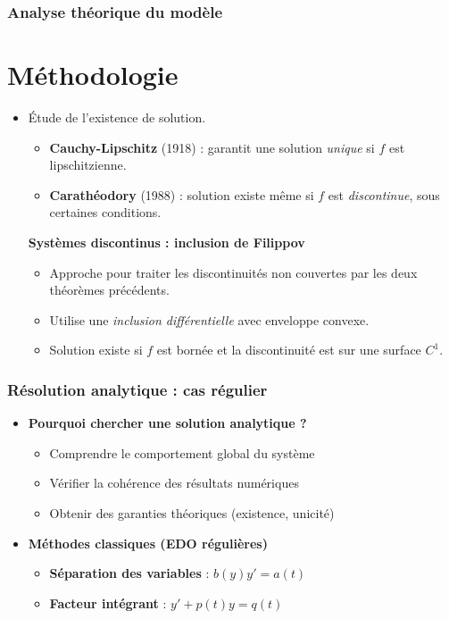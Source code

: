 \documentclass[handout]{beamer}
\newtheorem{pbm et hypo}[thm]{Problématique et hypothèses}
\begin{document}
	\begin{frame}
		\frametitle{Analyse théorique du modèle}
		\section{Méthodologie}
		\begin{itemize}
			\item[\maltese] Étude de l'existence de solution.
			\begin{itemize}
				\item \textbf{Cauchy-Lipschitz} (1918) : garantit une solution \textit{unique} si $f$ est lipschitzienne.
				\item \textbf{Carathéodory} (1988) : solution existe même si $f$ est \textit{discontinue}, sous certaines conditions.
			\end{itemize}
			
			\pause
			\textbf{Systèmes discontinus : inclusion de Filippov}
			\begin{itemize}
				\item Approche pour traiter les discontinuités non couvertes par les deux théorèmes précédents.
				\item Utilise une \textit{inclusion différentielle} avec enveloppe convexe.
				\item Solution existe si $f$ est bornée et la discontinuité est sur une surface $C^1$.
			\end{itemize}
		\end{itemize}
	\end{frame}
	
	\begin{frame}
		\frametitle{Résolution analytique : cas régulier}
		\begin{itemize}
			\item[\maltese] \textbf{Pourquoi chercher une solution analytique ?}
			\begin{itemize}
				\item Comprendre le comportement global du système
				\item Vérifier la cohérence des résultats numériques
				\item Obtenir des garanties théoriques (existence, unicité)
			\end{itemize}
			
			\pause
			\item[\maltese] \textbf{Méthodes classiques (EDO régulières)}
			\begin{itemize}
				\item \textbf{Séparation des variables} : $b(y)y' = a(t)$
				\item \textbf{Facteur intégrant} : $y' + p(t)y = q(t)$
			\end{itemize}
		\end{itemize}
	\end{frame}
	
\end{document}
